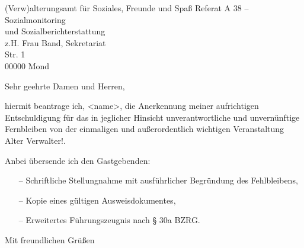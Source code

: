 \documentclass[
    sender,
    paper=a4,
    version=last,
    fontsize=11pt,
    DIV=13,
    BCOR=0mm]{scrlttr2}
\begin{document}
\begin{letter}{
(Verw)alterungsamt für Soziales, Freunde und Spaß
Referat A 38 – Sozialmonitoring\\ und Sozialberichterstattung\\
z.H. Frau Band, Sekretariat\\
Str. 1\\
00000 Mond

}
\opening{Sehr geehrte Damen und Herren,}


hiermit beantrage ich, <name>, die Anerkennung meiner aufrichtigen Entschuldigung für das in jeglicher Hinsicht unverantwortliche und unvernünftige Fernbleiben von der einmaligen und außerordentlich wichtigen Veranstaltung \frqq Alter Verwalter!\flqq.

Anbei übersende ich den Gastgebenden:
\begin{itemize}
    \item [--] Schriftliche Stellungnahme mit ausführlicher Begründung des Fehlbleibens,
    \item [--] Kopie eines gültigen Ausweisdokumentes,
    \item [--] Erweitertes Führungszeugnis nach § 30a BZRG.
\end{itemize}
\vspace{1cm}
\closing{Mit freundlichen Grüßen} %

\end{letter}
\end{document}
